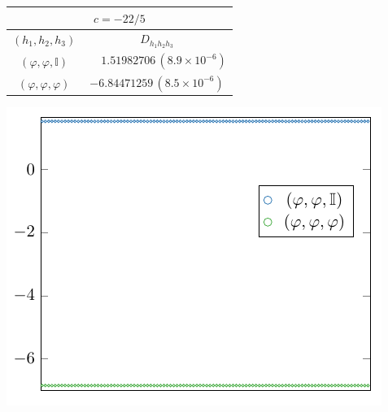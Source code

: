 \documentclass[a4paper,11pt]{article}
\begin{document}
\begin{table}[tbp]
\begin{minipage}{0.5\linewidth}
\centering
\begin{tabular}{|c|c|}
\multicolumn{2}{c}{$c=-22/5$}\\
\hline 
  $(h_1, h_2, h_3)$ &  $D_{h_1 h_2 h_3}$ \\ 
 \hline
 $(\varphi, \varphi, \mathbb{I})$ &  $\phantom{-}1.51982706 \, (8.9\times 10^{-6})$      \\
 $(\varphi, \varphi, \varphi)$ &    $-6.84471259 \, (8.5\times 10^{-6})$     \\
 \hline
\end{tabular}
\end{minipage}
\begin{minipage}{0.5\linewidth}
 \centering
 \includegraphics[width=\textwidth]{bootstrap_lee-yang_3.pdf}
\end{minipage}
\vspace{0.75cm}


\end{table}
\end{document}
